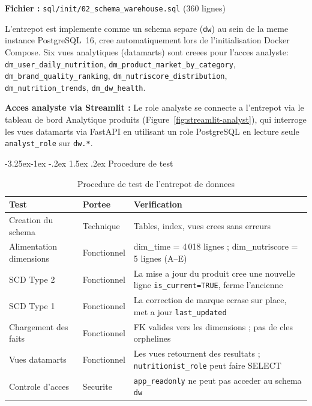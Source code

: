 \documentclass[a4paper,11pt,oneside,openany]{report}
\makeatletter
\renewcommand\subsection{\@startsection{subsection}{2}{\z@}%
  {-3.25ex\@plus -1ex \@minus -.2ex}%
  {1.5ex \@plus .2ex}%
  {\normalfont\large\bfseries\color{ntdarkgreen}}}
\makeatother
\begin{document}
\textbf{Fichier :} \texttt{sql/init/02\_schema\_warehouse.sql} (360 lignes)

L'entrepot est implemente comme un schema separe (\texttt{dw}) au sein de
la meme instance PostgreSQL~16, cree automatiquement lors de
l'initialisation Docker Compose. Six vues analytiques (datamarts) sont
creees pour l'acces analyste: \texttt{dm\_user\_daily\_nutrition},
\texttt{dm\_product\_market\_by\_category},
\texttt{dm\_brand\_quality\_ranking},
\texttt{dm\_nutriscore\_distribution},
\texttt{dm\_nutrition\_trends},
\texttt{dm\_dw\_health}.

\textbf{Acces analyste via Streamlit :} Le role analyste se connecte a
l'entrepot via le tableau de bord Analytique produits
(Figure~\ref{fig:streamlit-analyst}), qui interroge les vues datamarts via
FastAPI en utilisant un role PostgreSQL en lecture seule
\texttt{analyst\_role} sur \texttt{dw.*}.

\subsection{Procedure de test}

\begin{table}[H]
\centering
\caption{Procedure de test de l'entrepot de donnees}
\label{tab:test-dw}
\begin{tabularx}{\textwidth}{L{3cm} L{2cm} L{7.5cm}}
\toprule
\textbf{Test} & \textbf{Portee} & \textbf{Verification} \\
\midrule
Creation du schema & Technique & Tables, index, vues crees sans erreurs \\
Alimentation dimensions & Fonctionnel & dim\_time = 4\,018 lignes ; dim\_nutriscore = 5 lignes (A--E) \\
SCD Type 2 & Fonctionnel & La mise a jour du produit cree une nouvelle ligne \texttt{is\_current=TRUE}, ferme l'ancienne \\
SCD Type 1 & Fonctionnel & La correction de marque ecrase sur place, met a jour \texttt{last\_updated} \\
Chargement des faits & Fonctionnel & FK valides vers les dimensions ; pas de cles orphelines \\
Vues datamarts & Fonctionnel & Les vues retournent des resultats ; \texttt{nutritionist\_role} peut faire SELECT \\
Controle d'acces & Securite & \texttt{app\_readonly} ne peut pas acceder au schema \texttt{dw} \\
\bottomrule
\end{tabularx}
\end{table}
\end{document}
